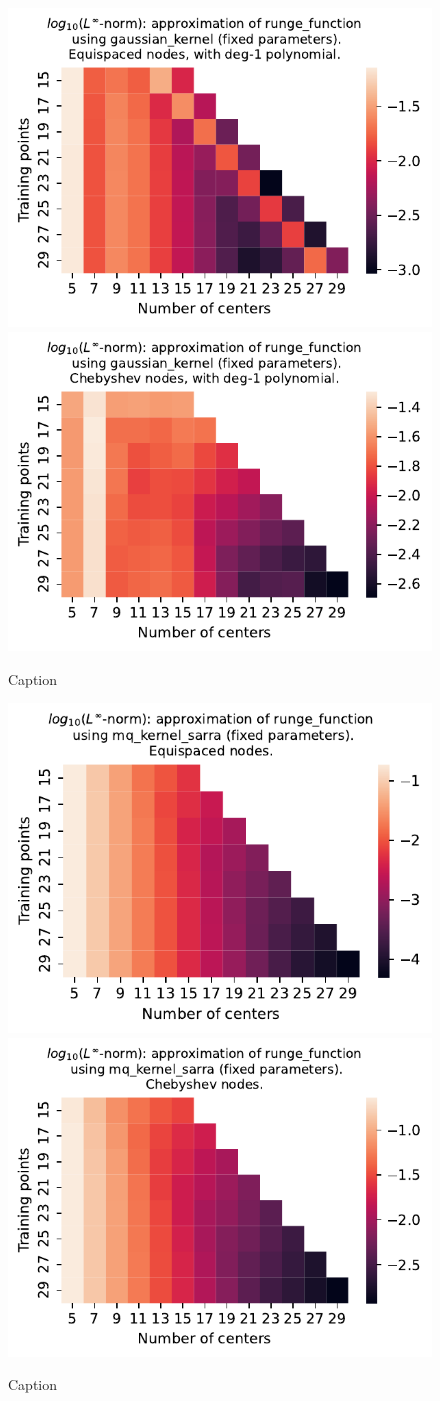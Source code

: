 \documentclass[12pt]{report} %
\begin{document}
\begin{figure}[ht]
  \centering

  \includegraphics[width=.49\textwidth]{imagenes/experiments/1d/least_squares/opt-runge_function-Kgaussian_kernel-Poly-Equi.pdf}
  \includegraphics[width=.49\textwidth]{imagenes/experiments/1d/least_squares/opt-runge_function-Kgaussian_kernel-Poly-Cheb.pdf}
  \caption{Caption}
  \label{fig:opt-runge-gaussian-poly}
\end{figure}

\begin{figure}[ht]
  \centering

  \includegraphics[width=.49\textwidth]{imagenes/experiments/1d/least_squares/opt-runge_function-Kmq_kernel_sarra-Equi.pdf}
  \includegraphics[width=.49\textwidth]{imagenes/experiments/1d/least_squares/opt-runge_function-Kmq_kernel_sarra-Cheb.pdf}
  \caption{Caption}
  \label{fig:opt-runge-sarra}
\end{figure}
\end{document}
